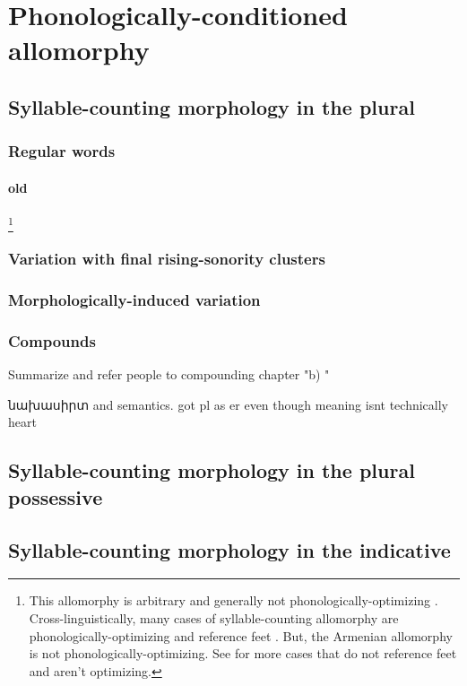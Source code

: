 
\chapter{Phonologically-conditioned allomorphy}
\section{Syllable-counting morphology in the plural}
\subsection{Regular words}

\subsubsection{old}
\footnote{This allomorphy is arbitrary and generally not phonologically-optimizing \citep{Vaux-2003-Syllabification}. Cross-linguistically, many cases of syllable-counting allomorphy are phonologically-optimizing and reference feet \citep{Kager-1996-AffixSyllableCounting,Gonzalez-2005-PhonoAllomorphyPanoan}. But, the Armenian allomorphy is not phonologically-optimizing. See \citet{Vaux-2003-Syllabification,Paster-2005-SubcatSyllableCounting,Paster-2006-PhonologicalConditionsAffixation,Paster-2019-PhonologyCounts} for more cases that do not reference feet and aren't optimizing.}


\subsection{Variation with final rising-sonority clusters}
\subsection{Morphologically-induced variation}
\subsection{Compounds}
Summarize and refer people to compounding chapter
"b)	"

նախասիրտ and semantics. got pl as er even though meaning isnt technically heart

\section{Syllable-counting morphology in the plural possessive}
\section{Syllable-counting morphology in the indicative}

